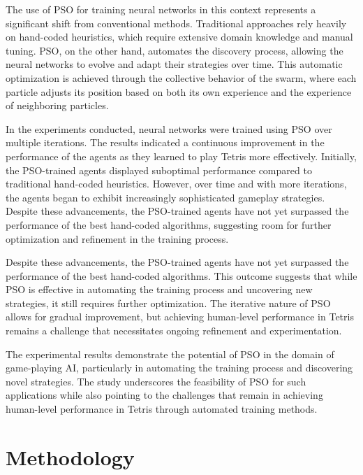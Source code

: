\documentclass[a4paper, 12pt]{extreport}
\begin{document}
	The use of PSO for training neural networks in this context represents a significant shift from conventional methods. Traditional approaches rely heavily on hand-coded heuristics, which require extensive domain knowledge and manual tuning. PSO, on the other hand, automates the discovery process, allowing the neural networks to evolve and adapt their strategies over time. This automatic optimization is achieved through the collective behavior of the swarm, where each particle adjusts its position based on both its own experience and the experience of neighboring particles.
	
	In the experiments conducted, neural networks were trained using PSO over multiple iterations. The results indicated a continuous improvement in the performance of the agents as they learned to play Tetris more effectively. Initially, the PSO-trained agents displayed suboptimal performance compared to traditional hand-coded heuristics. However, over time and with more iterations, the agents began to exhibit increasingly sophisticated gameplay strategies. Despite these advancements, the PSO-trained agents have not yet surpassed the performance of the best hand-coded algorithms, suggesting room for further optimization and refinement in the training process.
	
	Despite these advancements, the PSO-trained agents have not yet surpassed the performance of the best hand-coded algorithms. This outcome suggests that while PSO is effective in automating the training process and uncovering new strategies, it still requires further optimization. The iterative nature of PSO allows for gradual improvement, but achieving human-level performance in Tetris remains a challenge that necessitates ongoing refinement and experimentation.
	
	The experimental results demonstrate the potential of PSO in the domain of game-playing AI, particularly in automating the training process and discovering novel strategies. The study underscores the feasibility of PSO for such applications while also pointing to the challenges that remain in achieving human-level performance in Tetris through automated training methods.
	
	\chapter{Methodology}
	
	
\end{document}
